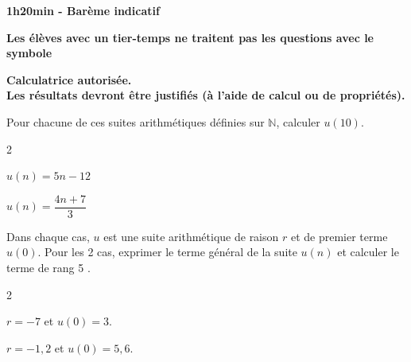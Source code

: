 \documentclass[11pt,a4paper]{article}  %
\begin{document}
	\graphicspath{{images/}}
	
	\begin{center}
		
		
	\end{center}

\begin{center}\textbf{1h20min - Barème indicatif}\end{center}
\begin{center}\textbf{Les élèves avec un tier-temps ne traitent pas les questions avec  le symbole }\end{center}
\begin{center}\textbf{Calculatrice autorisée.\\Les résultats devront être justifiés (à l'aide de calcul ou de propriétés).}\end{center}


Pour chacune de ces suites arithmétiques définies sur $\mathbb{N}$, calculer $u(10)$.
\begin{multicols}{2}
	\begin{enumMet}
		\item {} $u(n)=5 n-12$
		\item $u(n)=\dfrac{4 n+7}{3}$
	\end{enumMet}
\end{multicols}

Dans chaque cas, $u$ est une suite arithmétique de raison $r$ et de premier terme $u(0)$. Pour les 2 cas, exprimer le terme général de la suite $u(n)$ et calculer le terme de rang 5 .
\begin{multicols}{2}
	\begin{enumMet}
		\item $r=-7$ et $u(0)=3$.
		\item {} $r=-1,2$ et $u(0)=5,6$.
	\end{enumMet}
\end{multicols}
\end{document}
